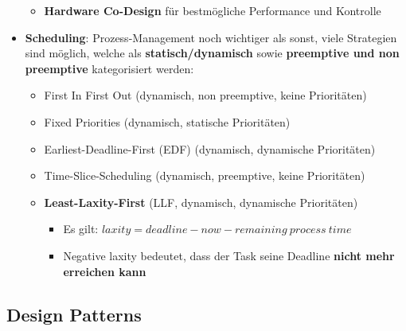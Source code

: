 \begin{itemize}
\begin{itemize}
		\item \textbf{Hardware Co-Design} für bestmögliche Performance und Kontrolle
	\end{itemize}
	\item \textbf{Scheduling}: Prozess-Management noch wichtiger als sonst, viele Strategien sind möglich, welche als \textbf{statisch/dynamisch} sowie \textbf{preemptive und non preemptive} kategorisiert werden:
	\begin{itemize}
		\item First In First Out (dynamisch, non preemptive, keine Prioritäten)
		\item Fixed Priorities (dynamisch, statische Prioritäten)
		\item Earliest-Deadline-First (EDF) (dynamisch, dynamische Prioritäten)
		\item Time-Slice-Scheduling (dynamisch, preemptive, keine Prioritäten)
		\item \textbf{Least-Laxity-First} (LLF, dynamisch, dynamische Prioritäten)
		\begin{itemize}
			\item Es gilt: $laxity = deadline - now - remaining\ process\ time$
			\item Negative laxity bedeutet, dass der Task seine Deadline \textbf{nicht mehr erreichen kann}
		\end{itemize}
	\end{itemize}
\end{itemize}

\subsection{Design Patterns}
\label{rtdp:sub:design_patterns}

